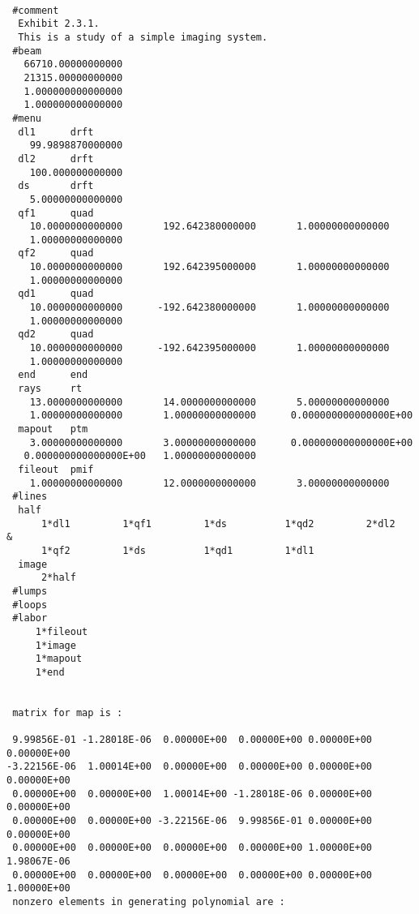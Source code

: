 {
\footnotesize\tt
\begin{verbatim}
 #comment
  Exhibit 2.3.1.
  This is a study of a simple imaging system.
 #beam
   66710.00000000000
   21315.00000000000
   1.000000000000000
   1.000000000000000
 #menu
  dl1      drft
    99.9898870000000
  dl2      drft
    100.000000000000
  ds       drft
    5.00000000000000
  qf1      quad
    10.0000000000000       192.642380000000       1.00000000000000
    1.00000000000000
  qf2      quad
    10.0000000000000       192.642395000000       1.00000000000000
    1.00000000000000
  qd1      quad
    10.0000000000000      -192.642380000000       1.00000000000000
    1.00000000000000
  qd2      quad
    10.0000000000000      -192.642395000000       1.00000000000000
    1.00000000000000
  end      end
  rays     rt
    13.0000000000000       14.0000000000000       5.00000000000000
    1.00000000000000       1.00000000000000      0.000000000000000E+00
  mapout   ptm
    3.00000000000000       3.00000000000000      0.000000000000000E+00
   0.000000000000000E+00   1.00000000000000
  fileout  pmif
    1.00000000000000       12.0000000000000       3.00000000000000
 #lines
  half
      1*dl1         1*qf1         1*ds          1*qd2         2*dl2
&
      1*qf2         1*ds          1*qd1         1*dl1
  image
      2*half
 #lumps
 #loops
 #labor
     1*fileout
     1*image
     1*mapout
     1*end


 matrix for map is :

 9.99856E-01 -1.28018E-06  0.00000E+00  0.00000E+00 0.00000E+00 0.00000E+00
-3.22156E-06  1.00014E+00  0.00000E+00  0.00000E+00 0.00000E+00 0.00000E+00
 0.00000E+00  0.00000E+00  1.00014E+00 -1.28018E-06 0.00000E+00 0.00000E+00
 0.00000E+00  0.00000E+00 -3.22156E-06  9.99856E-01 0.00000E+00 0.00000E+00
 0.00000E+00  0.00000E+00  0.00000E+00  0.00000E+00 1.00000E+00 1.98067E-06
 0.00000E+00  0.00000E+00  0.00000E+00  0.00000E+00 0.00000E+00 1.00000E+00
 nonzero elements in generating polynomial are :


\end{verbatim}}

